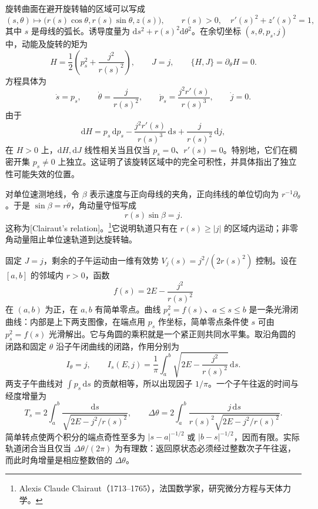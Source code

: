 \begin{example}\label{g4:exm:1104:surface-revolution}
	旋转曲面在避开旋转轴的区域可以写成
	\[
		(s,\theta)\longmapsto
		\bigl(r(s)\cos\theta,r(s)\sin\theta,z(s)\bigr),
		\qquad r(s)>0,\quad r'(s)^2+z'(s)^2=1,
	\]
	其中 \(s\) 是母线的弧长。诱导度量为 \(\mathrm{d}s^2+r(s)^2\mathrm{d}\theta^2\)。在余切坐标 \((s,\theta,p_s,j)\) 中，动能及旋转的矩为
	\begin{equation}\label{g4:eq:1104:revolution-hamiltonian}
		H=\frac12\left(p_s^2+\frac{j^2}{r(s)^2}\right),
		\qquad J=j,
		\qquad \{H,J\}=\partial_\theta H=0.
	\end{equation}
	方程具体为
	\[
		\dot s=p_s,\qquad
		\dot\theta=\frac{j}{r(s)^2},\qquad
		\dot p_s=\frac{j^2r'(s)}{r(s)^3},\qquad
		\dot j=0.
	\]
	由于
	\[
		\mathrm{d}H
		=p_s\,\mathrm{d}p_s-\frac{j^2r'(s)}{r(s)^3}\,\mathrm{d}s
		+\frac{j}{r(s)^2}\,\mathrm{d}j,
	\]
	在 \(H>0\) 上，\(\mathrm{d}H,\mathrm{d}J\) 线性相关当且仅当 \(p_s=0\)、\(r'(s)=0\)。特别地，它们在稠密开集 \(p_s\ne0\) 上独立。这证明了该旋转区域中的完全可积性，并具体指出了独立性可能失效的位置。

	对单位速测地线，令 \(\beta\) 表示速度与正向母线的夹角，正向纬线的单位切向为 \(r^{-1}\partial_\theta\)。于是 \(\sin\beta=r\dot\theta\)，角动量守恒写成
	\begin{equation}\label{g4:eq:1104:revolution-conservation}
		r(s)\sin\beta=j.
	\end{equation}
	这称为[Clairaut's relation]。\footnote{Alexis Claude Clairaut（1713--1765），法国数学家，研究微分方程与天体力学。}它说明轨道只有在 \(r(s)\ge|j|\) 的区域内运动；非零角动量阻止单位速轨道到达旋转轴。

	固定 \(J=j\)，剩余的子午运动由一维有效势 \(V_j(s)=j^2/(2r(s)^2)\) 控制。设在 \([a,b]\) 的邻域内 \(r>0\)，函数
	\[
		f(s)=2E-\frac{j^2}{r(s)^2}
	\]
	在 \((a,b)\) 为正，在 \(a,b\) 有简单零点。曲线 \(p_s^2=f(s)\)、\(a\le s\le b\) 是一条光滑闭曲线：内部是上下两支图像，在端点用 \(p_s\) 作坐标，简单零点条件使 \(s\) 可由 \(p_s^2=f(s)\) 光滑解出。它与角圆的乘积就是一个紧正则共同水平集。取沿角圆的闭路和固定 \(\theta\) 沿子午闭曲线的闭路，作用分别为
	\begin{equation}\label{g4:eq:1104:revolution-actions}
		I_\theta=j,
		\qquad I_s(E,j)=\frac1\pi\int_a^b
		\sqrt{2E-\frac{j^2}{r(s)^2}}\,\mathrm{d}s.
	\end{equation}
	两支子午曲线对 \(\int p_s\,\mathrm{d}s\) 的贡献相等，所以出现因子 \(1/\pi\)。一个子午往返的时间与经度增量为
	\begin{equation}\label{g4:eq:1104:revolution-return}
		T_s=2\int_a^b\frac{\mathrm{d}s}{\sqrt{2E-j^2/r(s)^2}},
		\qquad
		\Delta\theta=2\int_a^b
		\frac{j\,\mathrm{d}s}{r(s)^2\sqrt{2E-j^2/r(s)^2}}.
	\end{equation}
	简单转点使两个积分的端点奇性至多为 \(|s-a|^{-1/2}\) 或 \(|b-s|^{-1/2}\)，因而有限。实际轨道闭合当且仅当 \(\Delta\theta/(2\pi)\) 为有理数：返回原状态必须经过整数次子午往返，而此时角增量是相应整数倍的 \(\Delta\theta\)。
\end{example}

